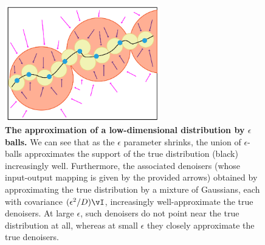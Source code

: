 \documentclass[../../book-main.tex]{subfiles}
\begin{document}
\begin{figure}
	\centering 
	\includegraphics[width=0.6\textwidth]{chapters/chapter3/figs/continuation.png}
	\caption{\small\textbf{The approximation of a low-dimensional distribution by \(\epsilon\) balls.} We can see that as the \(\epsilon\) parameter shrinks, the union of \(\epsilon\)-balls approximates the support of the true distribution (black) increasingly well. Furthermore, the associated denoisers (whose input-output mapping is given by the provided arrows) obtained by approximating the true distribution by a mixture of Gaussians, each with covariance \((\epsilon^{2}/D)\vI\), increasingly well-approximate the true denoisers. At large \(\epsilon\), such denoisers do not point near the true distribution at all, whereas at small \(\epsilon\) they closely approximate the true denoisers.}
	\label{fig:continuation}
\end{figure}
\end{document}
